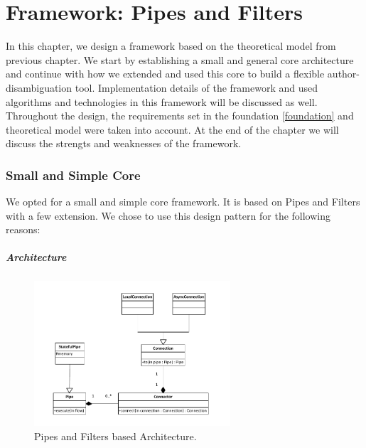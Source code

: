 \chapter{Framework: Pipes and Filters}

In this chapter, we design a framework based on the theoretical model from previous chapter. We start by establishing a small and general core architecture and continue with how we extended and used this core to build a flexible author-disambiguation tool. Implementation details of the framework and used algorithms and technologies in this framework will be discussed as well. Throughout the design, the requirements set in the foundation \autoref{foundation} and theoretical model were taken into account. At the end of the chapter we will discuss the strengts and weaknesses of the framework.


\subsection{Small and Simple Core}

We opted for a small and simple core framework. It is based on Pipes and Filters with a few extension. We chose to use this design pattern for the following reasons:

\begin{enumerate}
\item \textbf{S
\end{enumerate}

\paragraph{Architecture}

\begin{figure}[htbp]
	\centering
		\includegraphics[width=0.65\textwidth]{fig/architecturev2}
	\caption{Pipes and Filters based Architecture.}
	\label{fig:architecturev2}
\end{figure}


